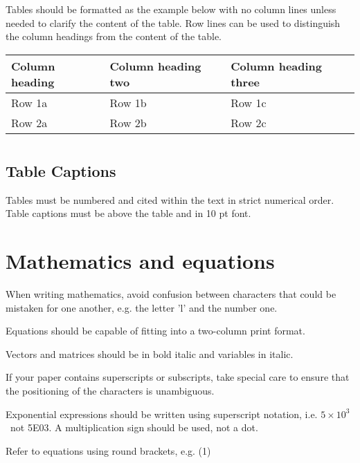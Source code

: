 \documentclass{IET}
\begin{document}
Tables should be formatted as the example below with no column lines unless
needed to clarify the content of the table. Row lines can be used to
distinguish the column headings from the content of the table.

\begin{table}[!h]
\begin{center}
{\begin{tabular}{@{}lll@{}}\hline
Column heading& Column heading two& Column heading three \\
\hline
Row 1a & Row 1b & Row 1c \\
Row 2a & Row 2b & Row 2c \\
\hline
\end{tabular}}{}
\label{tab1}
\end{center}
\end{table}

\section{}

\subsection{Table Captions}

Tables must be numbered and cited within the text in strict numerical order.
Table captions must be above the table and in 10 pt font.

\section{Mathematics and equations}

When writing mathematics, avoid confusion between characters that could be
mistaken for one another, e.g. the letter 'l' and the number one.

Equations should be capable of fitting into a two-column print format.

Vectors and matrices should be in bold italic and variables in italic.

If your paper contains superscripts or subscripts, take special care to
ensure that the positioning of the characters is unambiguous.

Exponential expressions should be written using superscript notation, i.e.
$5{\times}10^{3}$~not 5E03. A multiplication sign should be used, not a
dot.

Refer to equations using round brackets, e.g. (1)
\end{document}
